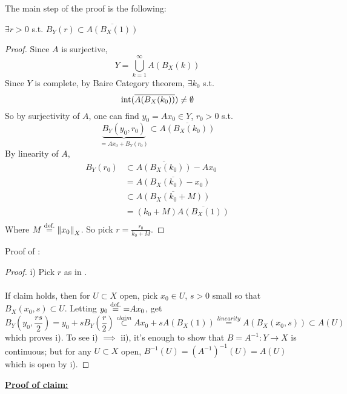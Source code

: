 \documentclass{article}
\begin{document}
The main step of the proof is the following:
\begin{lemma}[$A$ as in i)]\nl
\label{open ball is in closure}
$\exists r>0$ s.t. $B_Y(r)\subset \overline{A(B_X(1))}$
\end{lemma}
\begin{proof}
Since $A$ is surjective, 
$$
Y=\bigcup_{k=1}^\infty A(B_X(k))
$$
Since $Y$ is complete, by  Baire Category theorem, $\exists k_0$ s.t. 
$$ \textrm{int} (\overline{A(B_X(k_0))})\neq\emptyset$$
So by surjectivity of $A$, one can find $y_0=Ax_0\in Y$, $r_0>0$ s.t. 
$$ \underbrace{B_Y(y_0,r_0)}_{=Ax_0+B_Y(r_0)}\subset \overline{A(B_X(k_0))}$$
By linearity of $A$,
\begin{equation}\nonumber
    \begin{split}
        B_Y(r_0)&\subset\overline{A(B_X(k_0))}-Ax_0 \\ &=\overline{A(B_X(k_0)-x_0)}\\
        &\subset \overline{A(B_X(k_0+M))}   \\
        &=(k_0+M)\overline{A(B_X(1))}\\
    \end{split}
\end{equation}
Where $M\stackrel{\text{def.}}{=} \left\|{x_0}\right\|_X$. So pick $r=\frac{r_0}{k_0+M}$.
\end{proof}


Proof of :  

\begin{proof}
i) Pick $r$ as in .\\
\\
If claim holds, then for $U\subset X$ open, pick $x_0\in U$, $s>0$ small so that $B_X(x_0,s)\subset U$. Letting $y_0\stackrel{\text{def.}}{=}{=}Ax_0$, get 
$$
B_Y(y_0,\frac{rs}{2})=y_0+sB_Y(\frac{r}{2})\stackrel{claim}{\subset}Ax_0+sA(B_X(1))\stackrel{linearity}{=}A(B_X(x_0,s))\subset A(U)
$$
which proves i). To see i) $\implies$ ii), it's enough to show that $B=A^{-1}:Y\to X$ is continuous; but for any $U\subset X$ open, $B^{-1}(U)=(A^{-1})^{-1}(U)=A(U)$
which is open by i).
\end{proof}

\underline{\textbf{Proof of claim:}}
\end{document}
